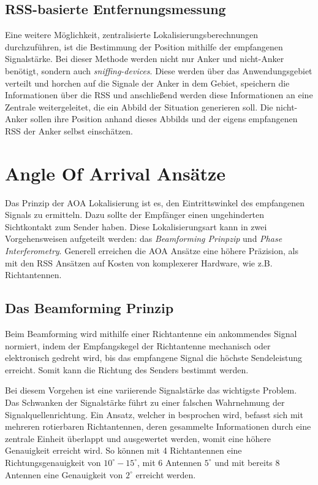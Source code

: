 \documentclass[12pt, a4wide]{scrreprt}
\begin{document}
    \subsection{RSS-basierte Entfernungsmessung}
Eine weitere Möglichkeit, zentralisierte Lokalisierungsberechnungen durchzuführen, ist die Bestimmung der Position mithilfe der empfangenen Signalstärke. Bei dieser Methode werden nicht nur Anker und nicht-Anker benötigt, sondern auch \textit{sniffing-devices}\cite{q1}. Diese werden über das Anwendungsgebiet verteilt und horchen auf die Signale der Anker in dem Gebiet, speichern die Informationen über die \ac{RSS} und anschließend werden diese Informationen an eine Zentrale weitergeleitet, die ein Abbild der Situation generieren soll. Die nicht-Anker sollen ihre Position anhand dieses Abbilds und der eigens empfangenen \ac{RSS} der Anker selbst einschätzen.

  \section{Angle Of Arrival Ansätze}
Das Prinzip der \acs{AOA} Lokalisierung ist es, den Eintrittswinkel des empfangenen Signals zu ermitteln. Dazu sollte der Empfänger einen ungehinderten Sichtkontakt zum Sender haben. Diese Lokalisierungsart kann in zwei Vorgehensweisen aufgeteilt werden: das \textit{Beamforming Prinpzip} und \textit{Phase Interferometry}. Generell erreichen die AOA Ansätze eine höhere Präzision, als mit den RSS Ansätzen auf Kosten von komplexerer Hardware\citep{q1}, wie z.B. Richtantennen.
    \subsection{Das Beamforming Prinzip}
Beim Beamforming wird mithilfe einer Richtantenne ein ankommendes Signal normiert, indem der Empfangskegel der Richtantenne mechanisch oder elektronisch gedreht wird, bis das empfangene Signal die höchste Sendeleistung erreicht. Somit kann die Richtung des Senders bestimmt werden. 

Bei diesem Vorgehen ist eine variierende Signalstärke das wichtigste Problem. Das Schwanken der Signalstärke führt zu einer falschen Wahrnehmung der Signalquellenrichtung. Ein Ansatz, welcher in \cite{q1} besprochen wird, befasst sich mit mehreren rotierbaren Richtantennen, deren gesammelte Informationen durch eine zentrale Einheit überlappt und ausgewertet werden, womit eine höhere Genauigkeit erreicht wird. So können mit 4 Richtantennen eine Richtungsgenauigkeit von $10^\circ -15^\circ$, mit 6 Antennen $5^\circ$ und mit bereits 8 Antennen eine Genauigkeit von $2^\circ$ erreicht werden\cite{q1}.
\end{document}
